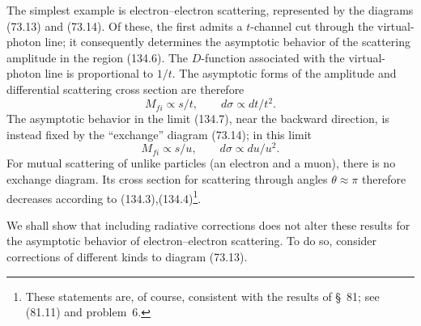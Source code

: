 The simplest example is electron--electron scattering, represented by the diagrams (73.13) and (73.14). Of these, the first admits a $t$-channel cut through the virtual-photon line; it consequently determines the asymptotic behavior of the scattering amplitude in the region (134.6). The $D$-function associated with the virtual-photon line is proportional to $1/t$. The asymptotic forms of the amplitude and differential scattering cross section are therefore
\begin{equation}
M_{fi}\propto s/t,\qquad d\sigma\propto dt/t^2.
\tag{134.8}
\end{equation}
The asymptotic behavior in the limit (134.7), near the backward direction, is instead fixed by the ``exchange'' diagram (73.14); in this limit
\[
M_{fi}\propto s/u,\qquad d\sigma\propto du/u^2.
\]
For mutual scattering of unlike particles (an electron and a muon), there is no exchange diagram. Its cross section for scattering through angles $\theta\approx\pi$ therefore decreases according to (134.3),(134.4)\footnote{These statements are, of course, consistent with the results of \S~81; see (81.11) and problem~6.}.

We shall show that including radiative corrections does not alter these results for the asymptotic behavior of electron--electron scattering. To do so, consider corrections of different kinds to diagram (73.13).

